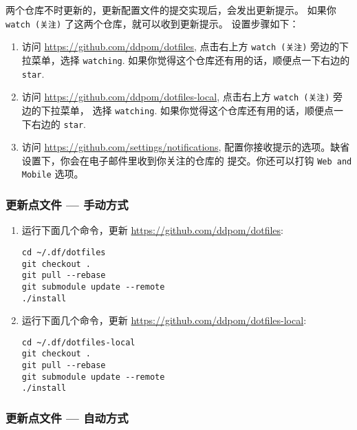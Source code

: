 \documentclass[
    11pt,
    cite=authoryear,
    device=normal,
    lang=cn,
    mode=simple,
    result=answer,
    toc=onecol,
]{elegantbook_sierxue}
\begin{document}
两个仓库不时更新的，更新配置文件的提交实现后，会发出更新提示。
如果你 \lstinline{watch (关注)} 了这两个仓库，就可以收到更新提示。
设置步骤如下：
\begin{enumerate}
    \item 访问 \href{https://github.com/ddpom/dotfiles}
        {https://github.com/ddpom/dotfiles}, 点击右上方
        \lstinline{watch (关注)} 旁边的下拉菜单，选择 \lstinline{watching}.
        如果你觉得这个仓库还有用的话，顺便点一下右边的 \lstinline{star}.
    \item 访问 \href{https://github.com/ddpom/dotfiles-local}
        {https://github.com/ddpom/dotfiles-local},
        点击右上方 \lstinline{watch (关注)} 旁边的下拉菜单，
        选择 \lstinline{watching}.
        如果你觉得这个仓库还有用的话，顺便点一下右边的 \lstinline{star}.
    \item 访问 \href{https://github.com/settings/notifications}
        {https://github.com/settings/notifications},
        配置你接收提示的选项。缺省设置下，你会在电子邮件里收到你关注的仓库的
        提交。你还可以打钩 \lstinline{Web and Mobile} 选项。
\end{enumerate}

\subsubsection{更新点文件 --- 手动方式}%
\label{ssub:update-dotfiles-manual}

\begin{enumerate}
    \item 运行下面几个命令，更新 \href{https://github.com/ddpom/dotfiles}
        {https://github.com/ddpom/dotfiles}:
\begin{lstlisting}[escapeinside=``]
cd ~/.df/dotfiles
git checkout .
git pull --rebase
git submodule update --remote
./install
\end{lstlisting}
    \item 运行下面几个命令，更新
        \href{https://github.com/ddpom/dotfiles-local}
        {https://github.com/ddpom/dotfiles-local}:
\begin{lstlisting}[escapeinside=``]
cd ~/.df/dotfiles-local
git checkout .
git pull --rebase
git submodule update --remote
./install
\end{lstlisting}
\end{enumerate}

\subsubsection{更新点文件 --- 自动方式}%
\label{ssub:update-dotfiles-crontab}
\end{document}
